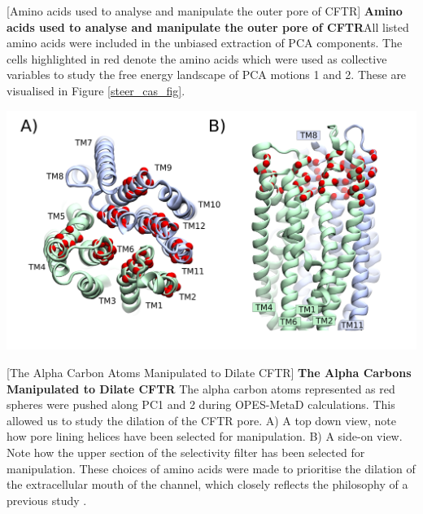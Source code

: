 \begingroup
\captionsetup{singlelinecheck = false, justification=raggedright}                           
[Amino acids used to analyse and manipulate the outer pore of CFTR] {\textbf{Amino acids used to analyse and manipulate the outer pore of CFTR}}{All listed amino acids were included in the unbiased extraction of PCA components. The cells highlighted in red denote the amino acids which were used as collective variables to study the free energy landscape of PCA motions 1 and 2. These are visualised in Figure \ref{steer_cas_fig}. }

\label{red_alpha_carbons_table}
\endgroup

\begingroup
	\begin{center}
		\includegraphics[width=1\textwidth]{figures/opening/steer_cas.pdf}
	\end{center}
	\captionsetup{singlelinecheck = false, justification=raggedright}
	[The Alpha Carbon Atoms Manipulated to Dilate CFTR] {\textbf{The Alpha Carbons Manipulated to Dilate CFTR}}{ The alpha carbon atoms represented as red spheres were pushed along PC1 and 2 during OPES-MetaD calculations. This allowed us to study the dilation of the CFTR pore. A) A top down view, note how pore lining helices have been selected for manipulation. B) A side-on view. Note how the upper section of the selectivity filter has been selected for manipulation. These choices of amino acids were made to prioritise the dilation of the extracellular mouth of the channel, which closely reflects the philosophy of a previous study \cite{hoffmann2018}. } 
	\label{steer_cas_fig}
\endgroup


